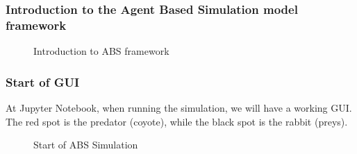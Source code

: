 \documentclass{article}
\begin{document}
\begin{normalsize}
\subsubsection{Introduction to the Agent Based Simulation model framework}
\begin{figure}[H]
	\caption{Introduction to ABS framework}
\end{figure}
\subsubsection{Start of GUI}
At Jupyter Notebook, when running the simulation, we will have a working GUI. The red spot is the predator (coyote), while the black spot is the rabbit (preys).
\begin{figure}[H]
	\caption{Start of ABS Simulation}
\end{figure}

\newpage

\end{normalsize}
\end{document}
